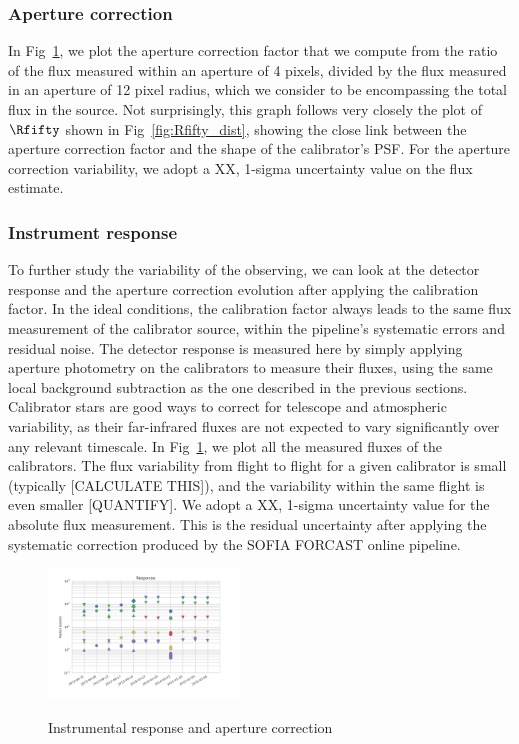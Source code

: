 \subsubsection{Aperture correction}
In Fig~\ref{fig:response}, we plot the aperture correction factor that we compute from the ratio of the flux measured within an aperture of 4 pixels, divided by the flux measured in an aperture of 12 pixel radius, which we consider to be encompassing the total flux in the source. Not surprisingly, this graph follows very closely the plot of $\Rfifty$ shown in Fig~\ref{fig:Rfifty_dist}, showing the close link between the aperture correction factor and the shape of the calibrator's PSF. For the aperture correction variability, we adopt a XX, 1-sigma uncertainty value on the flux estimate.



\subsubsection{Instrument response}
To further study the variability of the observing, we can look at the detector response and the aperture correction evolution after applying the calibration factor. In the ideal conditions, the calibration factor always leads to the same flux measurement of the calibrator source, within the pipeline's systematic errors and residual noise. The detector response is measured here by simply applying aperture photometry on the calibrators to measure their fluxes, using the same local background subtraction as the one described in the previous sections. Calibrator stars are good ways to correct for telescope and atmospheric variability, as their far-infrared fluxes are not expected to vary significantly over any relevant timescale. %
In Fig~\ref{fig:response}, we plot all the measured fluxes of the calibrators. The flux variability from flight to flight for a given calibrator is small (typically [CALCULATE THIS]), and the variability within the same flight is even smaller [QUANTIFY]. We adopt a XX, 1-sigma uncertainty value for the absolute flux measurement. This is the residual uncertainty after applying the systematic correction produced by the SOFIA FORCAST online pipeline.



\begin{figure}
\begin{center}

\includegraphics[width=0.45\textwidth]{Figures/Phot_val.png}
\label{fig:response}
\caption{Instrumental response and aperture correction}

\end{center}
\end{figure}

